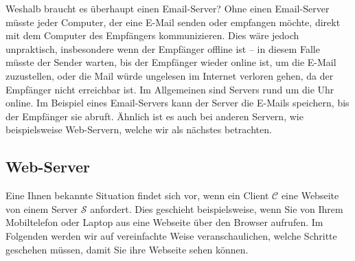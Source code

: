 Weshalb braucht es überhaupt einen Email-Server? Ohne einen Email-Server müsste jeder Computer, der eine E-Mail senden oder empfangen möchte, direkt mit dem Computer des Empfängers kommunizieren. Dies wäre jedoch unpraktisch, insbesondere wenn der Empfänger offline ist -- in diesem Falle müsste der Sender warten, bis der Empfänger wieder online ist, um die E-Mail zuzustellen, oder die Mail würde ungelesen im Internet verloren gehen, da der Empfänger nicht erreichbar ist. Im Allgemeinen sind Servers rund um die Uhr online. Im Beispiel eines Email-Servers kann der Server die E-Mails speichern, bis der Empfänger sie abruft. Ähnlich ist es auch bei anderen Servern, wie beispielsweise Web-Servern, welche wir als nächstes betrachten.

\subsection{Web-Server}
Eine Ihnen bekannte Situation findet sich vor, wenn ein Client $\mathcal{C}$ eine Webseite von einem Server $\mathcal{S}$ anfordert. Dies geschieht beispielsweise, wenn Sie von Ihrem Mobiltelefon oder Laptop aus eine Webseite über den Browser aufrufen. Im Folgenden werden wir auf vereinfachte Weise veranschaulichen, welche Schritte geschehen müssen, damit Sie ihre Webseite sehen können.


